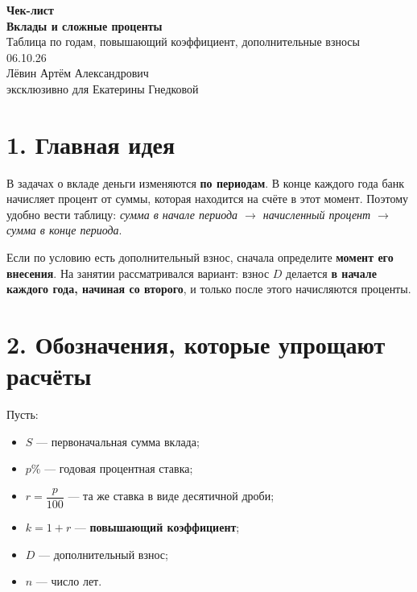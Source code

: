 \documentclass[a4paper,12pt]{article}
\newcommand{\key}[1]{\textcolor{darkaccent}{\textbf{#1}}}
\begin{document}
\thispagestyle{empty}
\begin{center}
\vspace*{28mm}
{\Large\textcolor{accent}{\textbf{Чек-лист}}}\\[8mm]
{\Huge\textbf{Вклады и сложные проценты}}\\[5mm]
{\large Таблица по годам, повышающий коэффициент, дополнительные взносы}\\[18mm]
{\large 06.10.26}\\[28mm]
{\large Лёвин Артём Александрович}\\[3mm]
{\large\textcolor{darkaccent}{эксклюзивно для Екатерины Гнедковой}}
\end{center}

\vfill
\begin{center}
\end{center}
\clearpage

\section*{1. Главная идея}

В задачах о вкладе деньги изменяются \key{по периодам}. В конце каждого года банк начисляет процент от суммы, которая находится на счёте в этот момент. Поэтому удобно вести таблицу: \textit{сумма в начале периода $\to$ начисленный процент $\to$ сумма в конце периода}.

Если по условию есть дополнительный взнос, сначала определите \key{момент его внесения}. На занятии рассматривался вариант: взнос $D$ делается \key{в начале каждого года, начиная со второго}, и только после этого начисляются проценты.

\section*{2. Обозначения, которые упрощают расчёты}

Пусть:
\begin{itemize}
  \item $S$ --- первоначальная сумма вклада;
  \item $p\%$ --- годовая процентная ставка;
  \item $r=\dfrac{p}{100}$ --- та же ставка в виде десятичной дроби;
  \item $k=1+r$ --- \key{повышающий коэффициент};
  \item $D$ --- дополнительный взнос;
  \item $n$ --- число лет.
\end{itemize}
\end{document}
